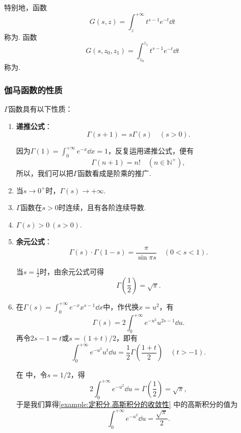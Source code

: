 特别地，函数\[
G(s,z) = \int_z^{+\infty} t^{s-1} e^{-t} \dd{t}
\]称为.
函数\[
G(s,z_0,z_1) = \int_{z_0}^{z_1} t^{s-1} e^{-t} \dd{t}
\]称为.

\subsubsection{伽马函数的性质}
\begin{property}
\(\Gamma\)函数具有以下性质：
\begin{enumerate}
\item \textbf{递推公式}：\begin{equation}
\Gamma(s+1) = s \Gamma(s) \quad (s > 0).
\end{equation}

因为\(\Gamma(1) = \int_0^{+\infty} e^{-x} \dd{x} = 1\)，反复运用递推公式，便有\begin{equation}\label{equation:定积分.伽马函数与阶乘的联系}
\Gamma(n+1) = n! \quad (n\in\mathbb{N}^+),
\end{equation}所以，我们可以把\(\Gamma\)函数看成是阶乘的推广.

\item 当\(s\to0^+\)时，\(\Gamma(s) \to +\infty\).

\item \(\Gamma\)函数在\(s > 0\)时连续，且有各阶连续导数.

\item \(\Gamma(s) > 0\ (s>0)\).

\item \textbf{余元公式}：\begin{equation}\label{equation:定积分.余元公式}
\Gamma(s) \cdot \Gamma(1-s) = \frac{\pi}{\sin{\pi s}} \quad (0 < s < 1).
\end{equation}

当\(s = \frac{1}{2}\)时，由余元公式可得\begin{equation}
\Gamma\left(\frac{1}{2}\right) = \sqrt{\pi}.
\end{equation}

\item 在\(\Gamma(s) = \int_0^{+\infty} e^{-x} x^{s-1} \dd{x}\)中，作代换\(x = u^2\)，有\begin{equation}\label{equation:定积分.伽马函数.中间步骤1}
\Gamma(s) = 2 \int_0^{+\infty} e^{-u^2} u^{2s-1} \dd{u}.
\end{equation}
再令\(2s-1 = t\)或\(s = (1+t)/2\)，即有\begin{equation}
\int_0^{+\infty} e^{-u^2} u^t \dd{u}
= \frac{1}{2} \Gamma\left(\frac{1+t}{2}\right)
\quad (t > -1).
\end{equation}

在  中，令\(s=1/2\)，得\[
2\int_0^{+\infty} e^{-u^2} \dd{u}
= \Gamma\left(\frac{1}{2}\right)
= \sqrt{\pi},
\]
于是我们算得\cref{example:定积分.高斯积分的收敛性} 中的高斯积分的值为
\begin{equation}
\int_0^{+\infty} e^{-u^2} \dd{u} = \frac{\sqrt{\pi}}{2}.
\end{equation}
\end{enumerate}
\end{property}

